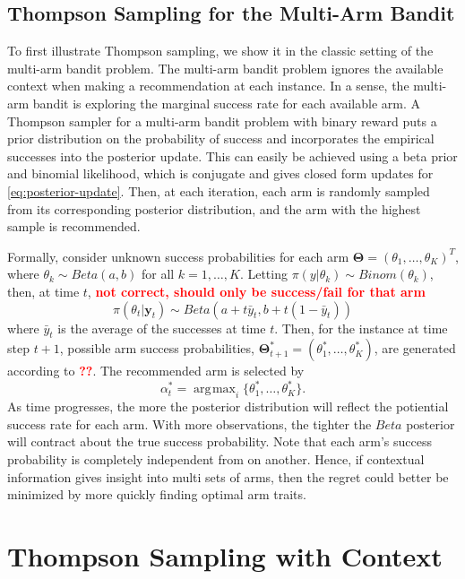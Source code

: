 \documentclass[12pt]{article}
\newcommand{\bred}[1]{\textbf{\textcolor{red}{#1}}}
\DeclareMathOperator*{\argmax}{\arg\!\max}
\begin{document}
\subsection{Thompson Sampling for the Multi-Arm Bandit}

To first illustrate Thompson sampling, we show it in the classic setting of the 
multi-arm bandit problem. 
The multi-arm bandit problem ignores the available context when making a 
recommendation at each instance.
In a sense, the multi-arm bandit is exploring the marginal success rate for each
available arm.
A Thompson sampler for a multi-arm bandit problem with binary reward puts a prior
distribution on the probability of success and incorporates the empirical successes
into the posterior update.
This can easily be achieved using a beta prior and binomial likelihood, which is
conjugate and gives closed form updates for \eqref{eq:posterior-update}.
Then, at each iteration, each arm is randomly sampled from its corresponding 
posterior distribution, and the arm with the highest sample is recommended.

Formally, consider unknown success probabilities for each arm 
$\bm{\Theta} = (\theta_1, \ldots, \theta_K)^T$,
where 
$\theta_k \sim Beta(a,b)$
for all $k = 1, \ldots, K$.
Letting 
$\pi(y \vert \theta_k) \sim Binom(\theta_k)$, 
then, at time $t$, \bred{not correct, should only be success/fail for that arm}
\begin{equation}
\pi(\theta_t \vert \bm{y}_t) \sim 
Beta(a + t\bar{y}_t, b + t (1 - \bar{y}_t))
\end{equation}
where $\bar{y}_t$ is the average of the successes at time $t$.  
Then, for the instance at time step $t + 1$, possible arm success probabilities,
$\bm{\Theta}_{t+1}^* = (\theta_1^*, \ldots, \theta_K^*)$,
are generated according to \bred{??}.
The recommended arm is selected by 
\begin{equation}
\alpha_t^* = \argmax_i \{\theta_1^*, \ldots, \theta_K^*\}.
\end{equation}
As time progresses, the more the posterior distribution will reflect the potiential 
success rate for each arm.
With more observations, the tighter the $Beta$ posterior will contract about the 
true success probability.
Note that each arm's success probability is completely independent from on another.
Hence, if contextual information gives insight into multi sets of arms, then the
regret could better be minimized by more quickly finding optimal arm traits.

\section{Thompson Sampling with Context}
\end{document}
